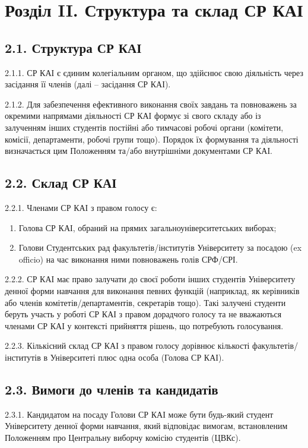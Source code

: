 \section*{Розділ II. Структура та склад СР КАІ}

\subsection*{2.1. Структура СР КАІ}
    2.1.1. СР КАІ є єдиним колегіальним органом, що здійснює свою діяльність через засідання її членів (далі – засідання СР КАІ).

    2.1.2. Для забезпечення ефективного виконання своїх завдань та повноважень за окремими напрямами діяльності СР КАІ формує зі свого складу або із залученням інших студентів постійні або тимчасові робочі органи (комітети, комісії, департаменти, робочі групи тощо). Порядок їх формування та діяльності визначається цим Положенням та/або внутрішніми документами СР КАІ.

\subsection*{2.2. Склад СР КАІ}
    2.2.1. Членами СР КАІ з правом голосу є:

        \begin{enumerate}[label=\alph*)]
            \item Голова СР КАІ, обраний на прямих загальноуніверситетських виборах;
            \item Голови Студентських рад факультетів/інститутів Університету за посадою (ex officio) на час виконання ними повноважень голів СРФ/СРІ.
        \end{enumerate}

    2.2.2. СР КАІ має право залучати до своєї роботи інших студентів Університету денної форми навчання для виконання певних функцій (наприклад, як керівників або членів комітетів/департаментів, секретарів тощо). Такі залучені студенти беруть участь у роботі СР КАІ з правом дорадчого голосу та не вважаються членами СР КАІ у контексті прийняття рішень, що потребують голосування.

    2.2.3. Кількісний склад СР КАІ з правом голосу дорівнює кількості факультетів/інститутів в Університеті плюс одна особа (Голова СР КАІ).

\subsection*{2.3. Вимоги до членів та кандидатів}
    2.3.1. Кандидатом на посаду Голови СР КАІ може бути будь-який студент Університету денної форми навчання, який відповідає вимогам, встановленим Положенням про Центральну виборчу комісію студентів (ЦВКс).

